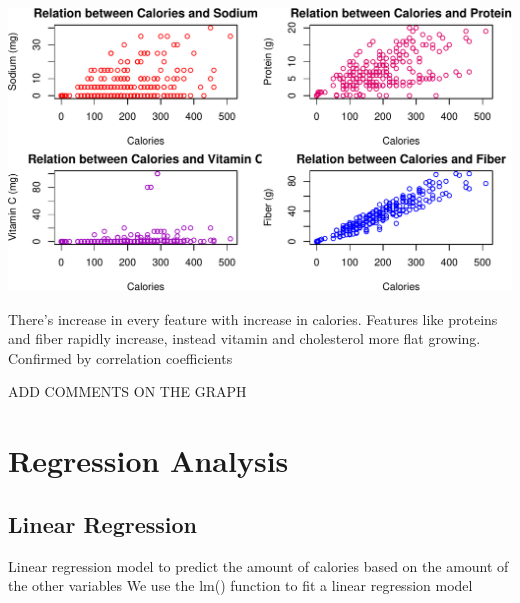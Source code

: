 \documentclass[
]{article}
\newenvironment{Shaded}{\begin{snugshade}}{\end{snugshade}}
\newcommand{\AttributeTok}[1]{\textcolor[rgb]{0.13,0.29,0.53}{#1}}
\newcommand{\CommentTok}[1]{\textcolor[rgb]{0.56,0.35,0.01}{\textit{#1}}}
\newcommand{\DecValTok}[1]{\textcolor[rgb]{0.00,0.00,0.81}{#1}}
\newcommand{\FunctionTok}[1]{\textcolor[rgb]{0.13,0.29,0.53}{\textbf{#1}}}
\newcommand{\NormalTok}[1]{#1}
\newcommand{\OtherTok}[1]{\textcolor[rgb]{0.56,0.35,0.01}{#1}}
\newcommand{\SpecialCharTok}[1]{\textcolor[rgb]{0.81,0.36,0.00}{\textbf{#1}}}
\begin{document}
\begin{center}\includegraphics{Statistical_Learning_Final_Report_files/figure-latex/scatterplot-1} \end{center}

There's increase in every feature with increase in calories. Features
like proteins and fiber rapidly increase, instead vitamin and
cholesterol more flat growing. Confirmed by correlation coefficients

ADD COMMENTS ON THE GRAPH

\section{Regression Analysis}\label{regression-analysis}

\subsection{Linear Regression}\label{linear-regression}

Linear regression model to predict the amount of calories based on the
amount of the other variables We use the lm() function to fit a linear
regression model

\begin{Shaded}
\end{Shaded}
\end{document}

